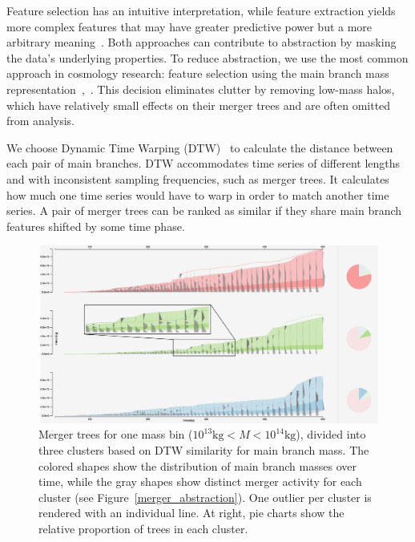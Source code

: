 
Feature selection has an intuitive interpretation, while feature extraction yields more complex features that may have greater predictive power but a more arbitrary meaning~\cite{clusteringbook}. Both approaches can contribute to abstraction by masking the data's underlying properties. To reduce abstraction, we use the most common approach in cosmology research: feature selection using the main branch mass representation~\cite{masshistory},~\cite{assemblyhistory}. This decision eliminates clutter by removing low-mass halos, which have relatively small effects on their merger trees and are often omitted from analysis.

We choose Dynamic Time Warping (DTW)~\cite{clusteringbook} to calculate the distance between each pair of main branches. DTW accommodates time series of different lengths and with inconsistent sampling frequencies, such as merger trees. It calculates how much one time series would have to warp in order to match another time series. A pair of merger trees can be ranked as similar if they share main branch features shifted by some time phase. 

\begin{figure}[h]
\includegraphics[width=\textwidth]{images/clusters/n3_d0_with_mergers}
\caption{Merger trees for one mass bin ($10^{13}\mathrm{kg} < M < 10^{14}\mathrm{kg}$), divided into three clusters based on DTW similarity for main branch mass. The colored shapes show the distribution of main branch masses over time, while the gray shapes show distinct merger activity for each cluster (see Figure~\ref{merger_abstraction}). One outlier per cluster is rendered with an individual line. At right, pie charts show the relative proportion of trees in each cluster.}
\label{three_clusters_with_mergers}
\end{figure}

